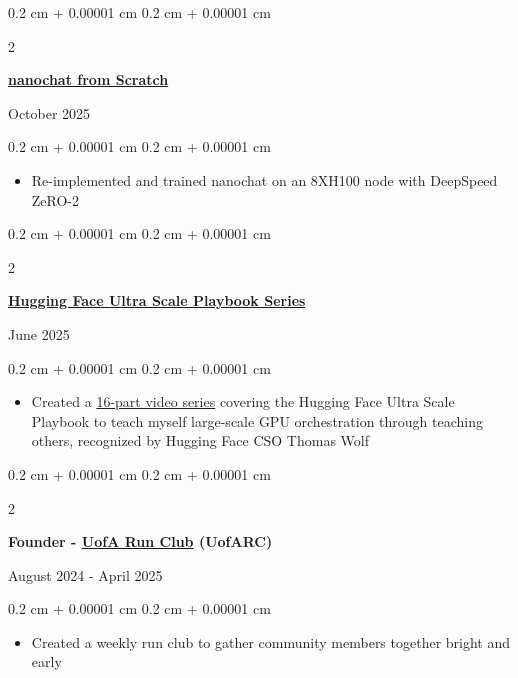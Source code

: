 \documentclass[10pt, letterpaper]{article}
\newenvironment{highlights}{
    \begin{itemize}[
        topsep=0.10 cm,
        parsep=0.10 cm,
        partopsep=0pt,
        itemsep=0pt,
        leftmargin=0.4 cm + 10pt
    ]
}{
    \end{itemize}
}
\newenvironment{onecolentry}{
    \begin{adjustwidth}{
        0.2 cm + 0.00001 cm
    }{
        0.2 cm + 0.00001 cm
    }
}{
    \end{adjustwidth}
}
\newenvironment{twocolentry}[2][]{
    \begin{adjustwidth}{
        0.2 cm + 0.00001 cm
    }{
        0.2 cm + 0.00001 cm
    }
    \def\secondColumn{#2}
    \setcolumnwidth{\fill, 4.5 cm}
    \begin{paracol}{2}
}{
    \switchcolumn \raggedleft \secondColumn
    \end{paracol}
    \end{adjustwidth}
}
\let\hrefWithoutArrow\href
\renewcommand{\href}[2]{\hrefWithoutArrow{#1}{#2}}
\begin{document}
        \vspace{0.09 cm}
        
        \begin{twocolentry}{
            October 2025
        }
            \textbf{\href{https://github.com/kiankyars/DeepLearning}{nanochat from Scratch}}
        \end{twocolentry}

        \vspace{0.09 cm}
        \begin{onecolentry}
            \begin{highlights}
                \item Re-implemented and trained nanochat on an 8XH100 node with DeepSpeed ZeRO-2
            \end{highlights}
        \end{onecolentry}
        
        \vspace{0.09 cm}
        
        \begin{twocolentry}{
            June 2025
        }
            \textbf{\href{https://github.com/kiankyars/Ultra-Scale-Playbook-Series}{Hugging Face Ultra Scale Playbook Series}}
        \end{twocolentry}

        \vspace{0.09 cm}
        \begin{onecolentry}
            \begin{highlights}
                \item Created a \href{https://youtube.com/playlist?list=PLWVevi-n5pPy-Y9swxvs5AiTwA_QzUXsr&si=TpY9vB9jMqNBk3aZ}{16-part video series} covering the Hugging Face Ultra Scale Playbook to teach myself large-scale GPU orchestration through teaching others, recognized by Hugging Face CSO Thomas Wolf
            \end{highlights}
        \end{onecolentry}
        
        \vspace{0.09 cm}

        \begin{twocolentry}{
            August 2024 - April 2025
        }
            \textbf{Founder - \href{https://www.instagram.com/uofarunclub/}{UofA Run Club} (UofARC)}
        \end{twocolentry}

        \vspace{0.09 cm}
        \begin{onecolentry}
            \begin{highlights}
                \item Created a weekly run club to gather community members together bright and early
            \end{highlights}
        \end{onecolentry}
\end{document}
